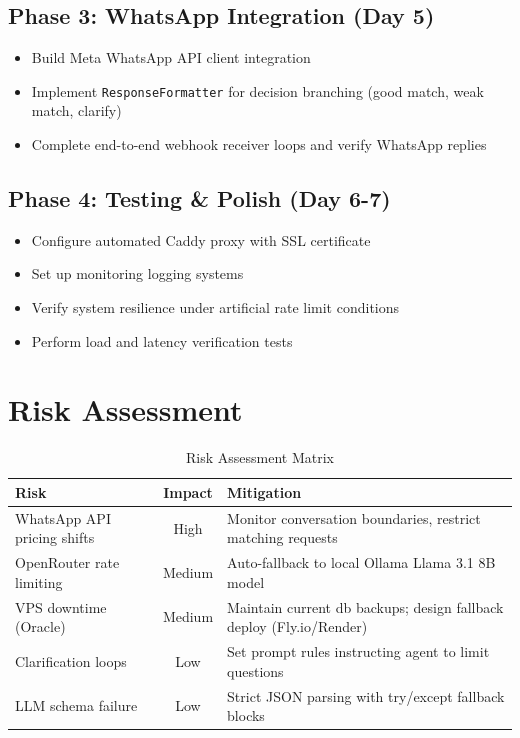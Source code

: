 \documentclass[12pt, a4paper]{report}
\newcommand{\techstack}[1]{\texttt{#1}}
\begin{document}
\section{Phase 3: WhatsApp Integration (Day 5)}

\begin{itemize}
    \item Build Meta WhatsApp API client integration
    \item Implement \techstack{ResponseFormatter} for decision branching (good match, weak match, clarify)
    \item Complete end-to-end webhook receiver loops and verify WhatsApp replies
\end{itemize}

\section{Phase 4: Testing \& Polish (Day 6-7)}

\begin{itemize}
    \item Configure automated Caddy proxy with SSL certificate
    \item Set up monitoring logging systems
    \item Verify system resilience under artificial rate limit conditions
    \item Perform load and latency verification tests
\end{itemize}

\chapter{Risk Assessment}

\begin{table}[H]
\centering
\renewcommand{\arraystretch}{1.4}
\begin{tabular}{|l|c|l|}
\hline
\textbf{Risk} & \textbf{Impact} & \textbf{Mitigation} \\
\hline
WhatsApp API pricing shifts & High & Monitor conversation boundaries, restrict matching requests \\
\hline
OpenRouter rate limiting & Medium & Auto-fallback to local Ollama Llama 3.1 8B model \\
\hline
VPS downtime (Oracle) & Medium & Maintain current db backups; design fallback deploy (Fly.io/Render) \\
\hline
Clarification loops & Low & Set prompt rules instructing agent to limit questions \\
\hline
LLM schema failure & Low & Strict JSON parsing with try/except fallback blocks \\
\hline
\end{tabular}
\caption{Risk Assessment Matrix}
\end{table}
\end{document}
